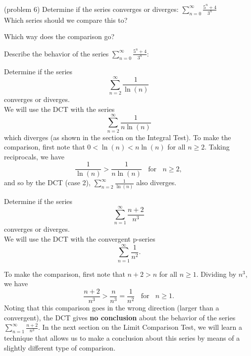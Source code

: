 \documentclass[handout]{ximera}
\begin{document}
\begin{problem}(problem 6)
Determine if the series converges or 
diverges: $\displaystyle{\sum_{n=0}^\infty \frac{5^n + 4}{3^n}}$\\
Which series should we compare this to?

\begin{multipleChoice}
\end{multipleChoice}

Which way does the comparison go?
\begin{multipleChoice}
\end{multipleChoice}

Describe the behavior of the series $\sum_{n=0}^\infty \frac{5^n + 4}{3^n}:$
\begin{multipleChoice}
\end{multipleChoice}

\end{problem}



\begin{example}[example 7] %
Determine if the series 
\[
\sum_{n=2}^\infty \frac{1}{\ln(n)}
\]
converges or diverges.\\
We will use the DCT with the series 
\[
\sum_{n=2}^\infty \frac{1}{n\ln(n)}
\]
 which diverges (as shown in the section on the Integral Test).
To make the comparison, first note that $0 < \ln(n) < n\ln(n)$ for all $n \geq 2$. Taking reciprocals, we have 
\[
\frac{1}{\ln(n)} > \frac{1}{n\ln(n)}  \;\; \text{ for } \;\; n \geq 2,
\]
and so by the DCT (case 2), $\sum_{n=2}^\infty \frac{1}{\ln(n)}$ also diverges.
\end{example}


\begin{example}[example 8] %
Determine if the series 
\[
\sum_{n=1}^\infty \frac{n+2}{n^3}
\]
 converges or diverges.\\
We will use the DCT with the convergent p-series 
\[
\sum_{n=1}^\infty \frac{1}{n^2}.
\]

To make the comparison, first note that $ n+2 > n$ for all $n \geq 1$. Dividing by $n^3$,
we have 
\[
\frac{n+2}{n^3} > \frac{n}{n^3} = \frac{1}{n^2} \; \; \text{ for } \; \; n \geq 1.
\]
Noting that this comparison goes in the wrong direction (larger than a convergent), the DCT gives \textbf{no conclusion}
about the behavior of the series $\sum_{n=1}^\infty \frac{n+2}{n^3}$. In the next section on the Limit Comparison Test, 
we will learn a technique that allows us to make a conclusion about this series by means of a slightly different type of comparison.
\end{example}
\end{document}
